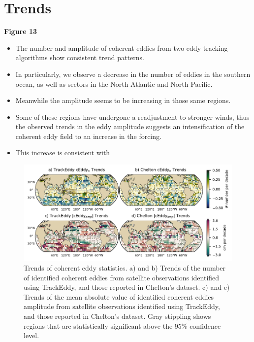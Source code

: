 \documentclass[draft,linenumbers]{agujournal2019}
\begin{document}
	\section{Trends}
	\label{sec:CE_trends}

	\textbf{Figure 13}
	\begin{itemize}
		\item The number and amplitude of coherent eddies from two eddy tracking algorithms show consistent trend patterns. 
		\item In particularly, we observe a decrease in the number of eddies in the southern ocean, as well as sectors in the North Atlantic and North Pacific. 
		\item Meanwhile the amplitude seems to be increasing in those same regions. 
		\item Some of these regions have undergone a readjustment to stronger winds, thus the observed trends in the eddy amplitude suggests an intensification of the coherent eddy field to an increase in the forcing.
		\item This increase is consistent with \citet{Martinez_Kinetic_2021}
	\end{itemize}

	\begin{figure}
	    \centering
	    \includegraphics[width=1\textwidth]{figures/all_trackeddy_trends.pdf}
	    \caption{Trends of coherent eddy statistics. a) and b) Trends of the number of identified coherent eddies from satellite observations identified using TrackEddy, and those reported in Chelton's dataset. c) and e) Trends of the mean absolute value of identified coherent eddies amplitude from satellite observations identified using TrackEddy, and those reported in Chelton's dataset. Gray stippling shows regions that are statistically significant above the 95\% confidence level.
		}
	    \label{fig:eddy_stats_trends}
	\end{figure}
\end{document}
